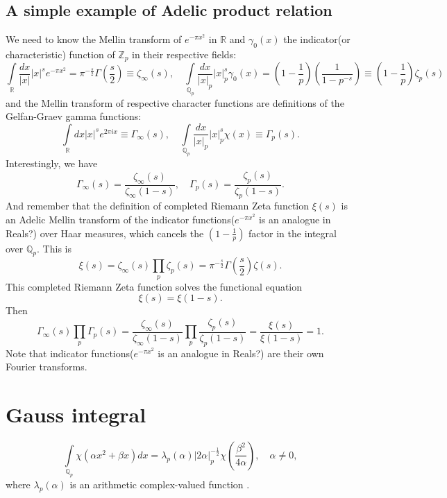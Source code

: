 \documentclass[12pt]{article}
\begin{document}
\subsection{A simple example of Adelic product relation}
We need to know the Mellin transform of $e^{-\pi x^2}$ in $\mathbb{R}$ and $\gamma_0(x)$ the indicator(or characteristic) function of $\mathbb{Z}_p$ in their respective fields:
\begin{equation}
\int\limits_\mathbb{R}\frac{dx}{|x|}|x|^s e^{-\pi x^2}=\pi^{-\frac{s}{2}}\Gamma(\frac{s}{2})\equiv\zeta_\infty(s), \quad \int\limits_{\mathbb{Q}_p}\frac{dx}{|x|_p}|x|_p^s \gamma_0(x)=(1-\frac{1}{p})(\frac{1}{1-p^{-s}})\equiv(1-\frac{1}{p})\zeta_p(s)
\end{equation}
and the Mellin transform of respective character functions are definitions of the Gelfan-Graev gamma functions:
\begin{equation}
\int\limits_\mathbb{R}dx|x|^s e^{2\pi i x}\equiv\Gamma_\infty(s), \quad \int\limits_{\mathbb{Q}_p}\frac{dx}{|x|_p}|x|_p^s \chi(x)\equiv\Gamma_p(s).
\end{equation}
Interestingly, we have
\begin{equation}
\Gamma_\infty(s)=\frac{\zeta_\infty(s)}{\zeta_\infty(1-s)}, \quad \Gamma_p(s)=\frac{\zeta_p(s)}{\zeta_p(1-s)}.
\end{equation}
And remember that the definition of completed Riemann Zeta function $\xi(s)$ is an Adelic Mellin transform of the indicator functions($e^{-\pi x^2}$ is an analogue in Reals?) over Haar measures, which cancels the $(1-\frac{1}{p})$ factor in the integral over $\mathbb{Q}_p$. This is
\begin{equation}
\xi(s)=\zeta_\infty(s)\prod\limits_p\zeta_p(s)=\pi^{-\frac{s}{2}}\Gamma(\frac{s}{2})\zeta(s).
\end{equation}
This completed Riemann Zeta function solves the functional equation
\begin{equation}
\xi(s)=\xi(1-s).
\end{equation}
Then
\begin{equation}
\Gamma_\infty(s)\prod\limits_p\Gamma_p(s)=\frac{\zeta_\infty(s)}{\zeta_\infty(1-s)}\prod\limits_p\frac{\zeta_p(s)}{\zeta_p(1-s)}=\frac{\xi(s)}{\xi(1-s)}=1.
\end{equation}
Note that indicator functions($e^{-\pi x^2}$ is an analogue in Reals?) are their own Fourier transforms.
\section{Gauss integral}
\begin{equation}
\int\limits_{\mathbb{Q}_p}\chi(\alpha x^2+\beta x)dx=\lambda_p(\alpha)|2\alpha|_p^{-\frac{1}{2}}\chi(\frac{\beta^2}{4\alpha}), \quad \alpha\neq 0,
\end{equation}
where $\lambda_p(\alpha)$ is an arithmetic complex-valued function \cite{Vladimirov:1994zz}.

\newpage


\end{document}
